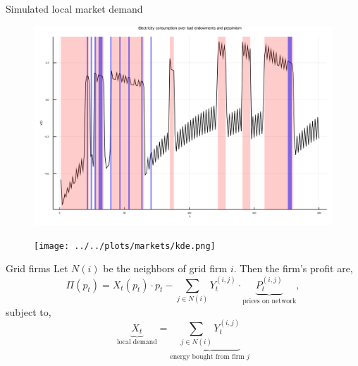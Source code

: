 \documentclass[xcolor={svgnames}]{beamer}
\begin{document}
\begin{frame}{Simulated local market demand}

    \begin{figure}
        \centering
        \begin{minipage}{.5\textwidth}
            \centering
            \includegraphics[width=\linewidth]{../../plots/markets/simul.png}
        \end{minipage}%
        \begin{minipage}{.5\textwidth}
            \centering
            \texttt{[image: ../../plots/markets/kde.png]}
        \end{minipage}
    \end{figure}

\end{frame}

\begin{frame}{Grid firms}
    Let $N(i)$ be the neighbors of grid firm $i$. Then the firm's profit are,
    \begin{equation}
        \Pi(p_t) = X_{t}(p_t) \cdot p_t - \sum_{j \in N(i)} Y^{(i, j)}_{t} \cdot \underbrace{P^{(i, j)}_t}_{\text{prices on network}},
    \end{equation}
    subject to,
    \begin{equation}
        \underbrace{X_t}_{\text{local demand}} =  \underbrace{\sum_{j \in N(i)} Y^{(i, j)}_{t}}_{\text{energy bought from firm $j$}}
    \end{equation}
\end{frame}
\end{document}
